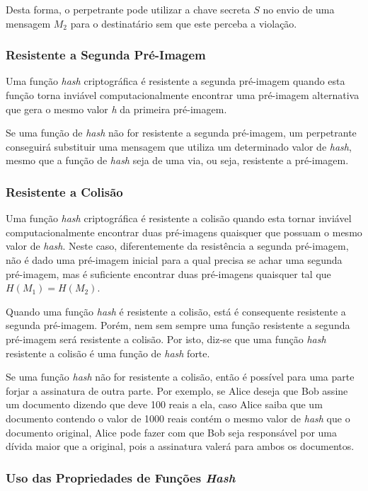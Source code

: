 Desta forma, o perpetrante pode utilizar a chave secreta $S$ no envio de uma
mensagem $M_2$ para o destinatário sem que este perceba a violação.

\subsubsection{Resistente a Segunda Pré-Imagem}

Uma função \textit{hash} criptográfica é resistente a segunda pré-imagem
quando esta função torna inviável computacionalmente encontrar uma pré-imagem
alternativa que gera o mesmo valor \textit{h} da primeira pré-imagem.

Se uma função de \textit{hash} não for resistente a segunda pré-imagem, um
perpetrante conseguirá substituir uma mensagem que utiliza um determinado valor
de \textit{hash}, mesmo que a função de \textit{hash} seja de uma via, ou seja,
resistente a pré-imagem.

\subsubsection{Resistente a Colisão}

Uma função \textit{hash} criptográfica é resistente a colisão quando esta
tornar inviável computacionalmente encontrar duas pré-imagens quaisquer que
possuam o mesmo valor de \textit{hash}. Neste caso, diferentemente da
resistência a segunda pré-imagem, não é dado uma pré-imagem inicial para a qual
precisa se achar uma segunda pré-imagem, mas é suficiente encontrar duas
pré-imagens quaisquer tal que $H(M_1) = H(M_2)$.

Quando uma função \textit{hash} é resistente a colisão, está é consequente
resistente a segunda pré-imagem. Porém, nem sem sempre uma função resistente a
segunda pré-imagem será resistente a colisão. Por isto, diz-se que uma função
\textit{hash} resistente a colisão é uma função de \textit{hash} forte.

Se uma função \textit{hash} não for resistente a colisão, então é possível para
uma parte forjar a assinatura de outra parte. Por exemplo, se Alice deseja que
Bob assine um documento dizendo que deve 100 reais a ela, caso Alice saiba que
um documento contendo o valor de 1000 reais contém o mesmo valor de
\textit{hash} que o documento original, Alice pode fazer com que Bob seja
responsável por uma dívida maior que a original, pois a assinatura valerá para
ambos os documentos.

\subsubsection{Uso das Propriedades de Funções \textit{Hash}}

